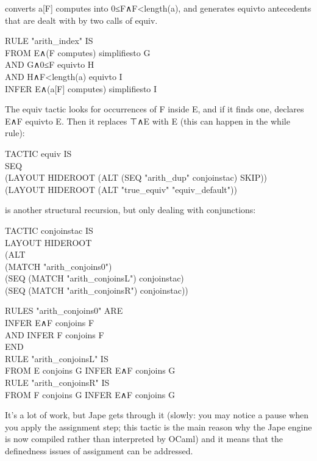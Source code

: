  converts a[F] computes into 0≤F∧F<length(a), and generates equivto antecedents that are dealt with by two calls of equiv.
\begin{japeish}
RULE "arith\_index" IS \\
     FROM E∧(F computes) simplifiesto G \\
\tab AND G∧0≤F equivto H \\
\tab AND H∧F<length(a) equivto I\\
\tab INFER E∧(a[F] computes) simplifiesto I 
\end{japeish}

The equiv tactic looks for occurrences of F inside E, and if it finds one, declares E∧F equivto E. Then it replaces ⊤∧E with E (this can happen in the while rule):
\begin{japeish}
TACTIC equiv IS \\
\tab SEQ \\
\tab \tab (LAYOUT HIDEROOT (ALT (SEQ "arith\_dup" conjoinstac) SKIP)) \\
\tab \tab (LAYOUT HIDEROOT (ALT "true\_equiv" "equiv\_default"))
\end{japeish}

 is another structural recursion, but only dealing with conjunctions:
\begin{japeish}
TACTIC conjoinstac IS \\
\tab LAYOUT HIDEROOT\\
\tab \tab (ALT \\
\tab \tab \tab (MATCH "arith\_conjoins0")\\
\tab \tab \tab (SEQ (MATCH "arith\_conjoinsL") conjoinstac)\\
\tab \tab \tab (SEQ (MATCH "arith\_conjoinsR") conjoinstac))
\end{japeish}
\begin{japeish}
RULES "arith\_conjoins0" ARE \\
\tab INFER E∧F conjoins F \\
AND INFER F conjoins F \\
END\\
RULE "arith\_conjoinsL" IS \\
\tab FROM E conjoins G INFER E∧F conjoins G \\
RULE "arith\_conjoinsR" IS \\
\tab FROM F conjoins G INFER E∧F conjoins G
\end{japeish}

It's a lot of work, but Jape gets through it (slowly: you may notice a pause when you apply the assignment step; this tactic is the main reason why the Jape engine is now compiled rather than interpreted by OCaml) and it means that the definedness issues of assignment can be addressed.


